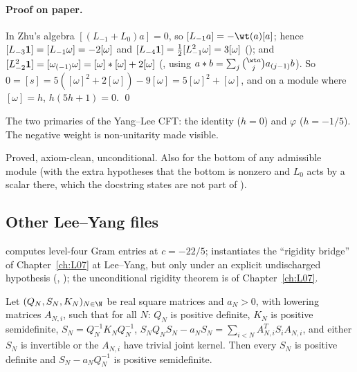 \paragraph{Proof on paper.} In Zhu's algebra $[(L_{-1}+L_0)a] = 0$, so $[L_{-1}a] = -\wt(a)[a]$; hence
$[L_{-3}\mathbf{1}] = [L_{-1}\omega] = -2[\omega]$ and $[L_{-4}\mathbf{1}] = \tfrac12[L_{-1}^2\omega] = 3[\omega]$
(); and $[L_{-2}^2\mathbf{1}] = [\omega_{(-1)}\omega] = [\omega]*[\omega]+2[\omega]$
(, using $a*b = \sum_j\binom{\wt a}{j}a_{(j-1)}b$). So
$0 = [s] = 5([\omega]^2+2[\omega]) - 9[\omega] = 5[\omega]^2+[\omega]$, and on a module where $[\omega] = h$,
$h(5h+1) = 0$. \qed

\begin{physics}
The two primaries of the Yang--Lee CFT: the identity ($h=0$) and $\varphi$ ($h = -1/5$). The negative
weight is non-unitarity made visible.
\end{physics}

\begin{status}
Proved, axiom-clean, unconditional. Also \allowbreak{}\allowbreak{}\allowbreak{}\allowbreak{}\allowbreak{}\allowbreak{} for
the bottom of any admissible module (with the extra hypotheses that the bottom is nonzero and $L_0$ acts
by a scalar there, which the docstring states are not part of ).
\end{status}

\subsection{Other Lee--Yang files}

 computes level-four Gram entries at $c=-22/5$; 
instantiates the ``rigidity bridge'' of Chapter~\ref{ch:L07} at Lee--Yang, but only under an explicit
undischarged hypothesis  (\allowbreak{}\allowbreak{}, ); the
unconditional rigidity theorem is \allowbreak{}\allowbreak{}\allowbreak{} of Chapter~\ref{ch:L07}.

\begin{theorem}\label{l19:thm:riccati}
Let $(Q_N,S_N,K_N)_{N\in\N}$ be real square matrices and $a_N>0$, with lowering matrices $A_{N,i}$, such that
for all $N$: $Q_N$ is positive definite, $K_N$ is positive semidefinite, $S_N = Q_N^{-1}K_NQ_N^{-1}$,
$S_NQ_NS_N - a_NS_N = \sum_{i<N}A_{N,i}^TS_iA_{N,i}$, and either $S_N$ is invertible or the $A_{N,i}$ have
trivial joint kernel. Then every $S_N$ is positive definite and $S_N - a_NQ_N^{-1}$ is positive semidefinite.
\end{theorem}

